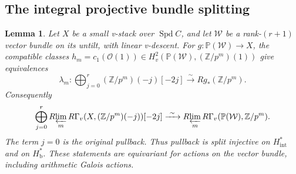 \documentclass[11pt]{article}
\numberwithin{equation}{section}
\newtheorem{lemma}[theorem]{Lemma}
\theoremstyle{definition}
\theoremstyle{remark}
\newcommand{\Z}{\mathbb Z}
\newcommand{\cO}{\mathcal O}
\DeclareMathOperator{\Spd}{Spd}
\newcommand{\Rlim}{R\!\varprojlim}
\begin{document}
\subsection{The integral projective bundle splitting}

\begin{lemma}\label{lem:projective-bundle}
Let $X$ be a small v-stack over $\Spd C$, and let $\mathcal W$ be a
rank-$(r+1)$ vector bundle on its untilt, with linear v-descent.
For $g:\mathbb P(\mathcal W)\to X$, the compatible classes
$h_m=c_1(\cO(1))\in H_v^2(\mathbb P(\mathcal W),(\Z/p^m)(1))$
give equivalences
\begin{equation}\label{eq:projective-finite}
 \lambda_m:
 \bigoplus_{j=0}^r(\Z/p^m)(-j)[-2j]
       \xrightarrow{\ \sim\ } Rg_*(\Z/p^m).
\end{equation}
Consequently
\begin{equation}\label{eq:projective-integral}
 \bigoplus_{j=0}^r
  \Rlim_m R\Gamma_v(X,(\Z/p^m)(-j))[-2j]
 \xrightarrow{\ \sim\ }
  \Rlim_m R\Gamma_v(\mathbb P(\mathcal W),\Z/p^m).
\end{equation}
The term $j=0$ is the original pullback.  Thus pullback is split
injective on $H^*_{\mathrm{int}}$ and on $H^*_{\mathrm b}$.
These statements are equivariant for actions on the vector bundle,
including arithmetic Galois actions.
\end{lemma}
\end{document}

